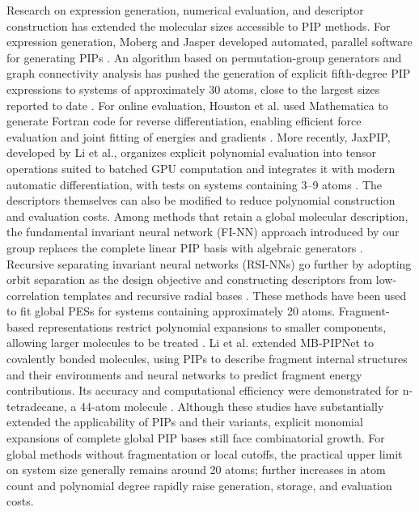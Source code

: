 Research on expression generation, numerical evaluation, and descriptor construction has extended the molecular sizes accessible to PIP methods.
For expression generation, Moberg and Jasper developed automated, parallel software for generating PIPs \cite{Moberg2021PIPUnrestricted}.
An algorithm based on permutation-group generators and graph connectivity analysis has pushed the generation of explicit fifth-degree PIP expressions to systems of approximately 30 atoms, 
close to the largest sizes reported to date \cite{Hao2025PIPFIAlgorithms}.
For online evaluation, Houston et al. used Mathematica to generate Fortran code for reverse differentiation, 
enabling efficient force evaluation and joint fitting of energies and gradients \cite{Houston2022PIPGradients}.
More recently, JaxPIP, developed by Li et al., 
organizes explicit polynomial evaluation into tensor operations suited to batched GPU computation and integrates it with modern automatic differentiation, 
with tests on systems containing 3--9 atoms \cite{Li2026JaxPIP}.
The descriptors themselves can also be modified to reduce polynomial construction and evaluation costs.
Among methods that retain a global molecular description, the fundamental invariant neural network (FI-NN) approach introduced by our group replaces the complete linear PIP basis with algebraic generators \cite{Shao2016FINN,Chen2020FINN2,Fu2023FIReview}.
Recursive separating invariant neural networks (RSI-NNs) go further by adopting orbit separation as the design objective and constructing descriptors from low-correlation templates and recursive radial bases \cite{hao2026SRI}.
These methods have been used to fit global PESs for systems containing approximately 20 atoms.
Fragment-based representations restrict polynomial expansions to smaller components, 
allowing larger molecules to be treated \cite{Conte2020EfficientPIP,Qu2024C14H30}.
Li et al. extended MB-PIPNet to covalently bonded molecules, using PIPs to describe fragment internal structures and their environments and neural networks to predict fragment energy contributions.
Its accuracy and computational efficiency were demonstrated for n-tetradecane, a 44-atom molecule \cite{Li_YuQiAlkanes}.
Although these studies have substantially extended the applicability of PIPs and their variants, explicit monomial expansions of complete global PIP bases still face combinatorial growth.
For global methods without fragmentation or local cutoffs, the practical upper limit on system size generally remains around 20 atoms; further increases in atom count and polynomial degree rapidly raise generation, storage, and evaluation costs.



